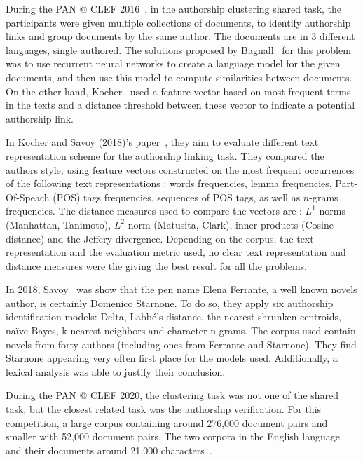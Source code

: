 During the PAN @ CLEF 2016~\cite{pan16}, in the authorship clustering shared task, the participants were given multiple collections of documents, to identify authorship links and group documents by the same author.
The documents are in 3 different languages, single authored.
The solutions proposed by Bagnall~\cite{bagnall_pan16} for this problem was to use recurrent neural networks to create a language model for the given documents, and then use this model to compute similarities between documents.
On the other hand, Kocher~\cite{kocher_pan16} used a feature vector based on most frequent terms in the texts and a distance threshold between these vector to indicate a potential authorship link.

In Kocher and Savoy (2018)'s paper~\cite{kocher_linking}, they aim to evaluate different text representation scheme for the authorship linking task.
They compared the authors style, using feature vectors constructed on the most frequent occurrences of the following text representations : words frequencies, lemma frequencies, Part-Of-Speach (POS) tags frequencies, sequences of POS tags, as well as $n$-grams frequencies.
The distance measures used to compare the vectors are : $L^1$ norms (Manhattan, Tanimoto), $L^2$ norm (Matusita, Clark), inner products (Cosine distance) and the Jeffery divergence.
Depending on the corpus, the text representation and the evaluation metric used, no clear text representation and distance measures were the giving the best result for all the problems.

In 2018, Savoy~\cite{savoy_starnone} was show that the pen name Elena Ferrante, a well known novels author, is certainly Domenico Starnone.
To do so, they apply six authorship identification models: Delta, Labbé's distance, the nearest shrunken centroids, naïve Bayes, k-nearest neighbors and character n-grams.
The corpus used contain novels from forty authors (including ones from Ferrante and Starnone).
They find Starnone appearing very often first place for the models used.
Additionally, a lexical analysis was able to justify their conclusion.

During the PAN @ CLEF 2020, the clustering task was not one of the shared task, but the closest related task was the authorship verification.
For this competition, a large corpus containing around 276,000 document pairs and smaller with 52,000 document pairs.
The two corpora in the English language and their documents around 21,000 characters~\cite{overview_pan20}.

